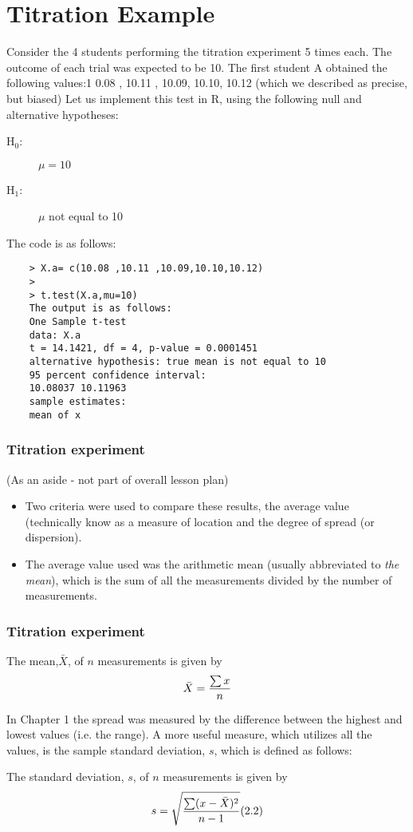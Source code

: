 \documentclass{beamer}
\begin{document}
\section{Titration Example}
\begin{frame}
Consider the 4 students performing the titration
	experiment 5 times each.
	The outcome of each trial was expected to be 10.
	The first student A obtained the following values:1 0.08 , 10.11 ,
	10.09, 10.10, 10.12 (which we described as precise, but biased)
	Let us implement this test in R, using the following null and
	alternative hypotheses:
	\begin{description}
	\item[H$_0$:] $\mu = 10$
	\item[H$_1$:] $\mu$ not equal to 10
	\end{description}
\end{frame}
\begin{frame}[fragile]
	The code is as follows:
	\begin{verbatim}
	> X.a= c(10.08 ,10.11 ,10.09,10.10,10.12)
	>
	> t.test(X.a,mu=10)
	The output is as follows:
	One Sample t-test
	data: X.a
	t = 14.1421, df = 4, p-value = 0.0001451
	alternative hypothesis: true mean is not equal to 10
	95 percent confidence interval:
	10.08037 10.11963
	sample estimates:
	mean of x
	\end{verbatim}
\end{frame}
\begin{frame}
	\frametitle{Titration experiment}
	(As an aside - not part of overall lesson plan)	
	\begin{itemize}
		\item	Two criteria were used to compare these results, the average value (technically know
		as a measure of location and the degree of spread (or dispersion). 
		\item The average value
		used was the arithmetic mean (usually abbreviated to \emph{the mean}), which is the sum
		of all the measurements divided by the number of measurements.	
	\end{itemize}	
	
	
\end{frame}
\begin{frame}
	\frametitle{Titration experiment}	
	The mean,$\bar{X}$, of $n$ measurements is given by \[ \bar{X}  = {\sum{x} \over n} \]
	
	In Chapter 1 the spread was measured by the difference between the highest and
	lowest values (i.e. the range). A more useful measure, which utilizes all the values, is the sample
	standard deviation, $s$, which is defined as follows:
	
	The standard deviation, $s$, of $n$ measurements is given by
	\[s=  \sqrt{ {\sum(x-\bar{X})^2 \over n-1} }  (2.2) \]
\end{frame}
\end{document}
